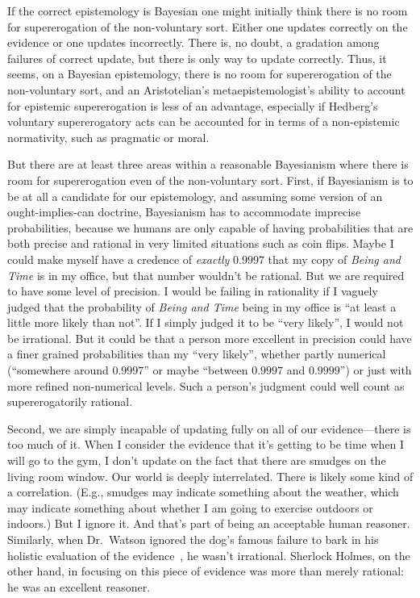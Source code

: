 If the correct epistemology is Bayesian one might initially think there is no room for supererogation
of the non-voluntary sort. Either one updates
correctly on the evidence or one updates incorrectly. There is, no doubt, a gradation among failures of correct update, 
but there is only way to update correctly.  Thus, it seems, on a Bayesian epistemology, there is no room for supererogation of the non-voluntary sort,
and an Aristotelian's metaepistemologist's ability to account for epistemic supererogation is less of an advantage,
especially if Hedberg's voluntary supererogatory acts can be accounted for in terms of a non-epistemic normativity,
such as pragmatic or moral.

But there are at least three areas within a reasonable Bayesianism where there is room for supererogation even of the non-voluntary sort.
First, if Bayesianism is to be at all a candidate for our epistemology, and assuming some version of an ought-implies-can doctrine,
Bayesianism has to accommodate imprecise probabilities, because we humans are only capable of having  
probabilities that are both precise and rational in very limited situations such as coin flips. Maybe I could make myself
have a credence of \textit{exactly} $0.9997$ that my copy of \textit{Being and Time} is in my office, but that number wouldn't 
be rational. But we are required to have some level of precision. I would be failing in rationality if I vaguely judged
that the probability of \textit{Being and Time} being in my office is ``at least a little more likely than not''. If I
simply judged it to be ``very likely'', I would not be irrational. But it could be that a person more excellent in precision
could have a finer grained probabilities than my ``very likely'', whether partly numerical (``somewhere around $0.9997$'' or
maybe ``between $0.9997$ and $0.9999$'') or just with more refined non-numerical levels. Such a person's judgment could well
count as supererogatorily rational. 

Second, we are simply incapable of updating fully on all of our evidence---there is too much of it. When
I consider the evidence that it's getting to be time when I will go to the gym, I don't update on the fact that there are
smudges on the living room window. Our world is deeply interrelated. There is likely some kind of a correlation. (E.g.,
smudges may indicate something about the weather, which may indicate something about whether I am going to exercise outdoors
or indoors.) But I ignore it. And that's part of being an acceptable human reasoner. Similarly, when Dr.~Watson ignored the dog's
famous failure to bark in his holistic evaluation of the evidence~\parencite[p.~111]{Doyle1927}, he wasn't irrational. Sherlock Holmes, on the other hand, in focusing
on this piece of evidence was more than merely rational: he was an excellent reasoner. 

